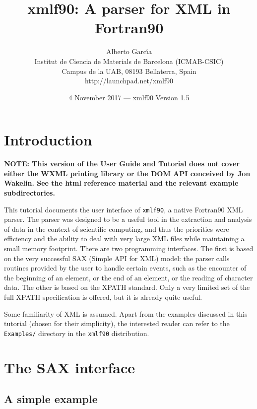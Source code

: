 \documentclass[11pt]{article}
\begin{document}
\title{xmlf90: A parser for XML in Fortran90}
\author{Alberto Garc\'{\i}a \\
  Institut de Ciencia de Materials de Barcelona (ICMAB-CSIC)\\
  Campus de la UAB, 08193 Bellaterra, Spain\\
           http://launchpad.net/xmlf90}
\date{4 November 2017 --- xmlf90 Version 1.5}

\maketitle\section{Introduction}

{\bf NOTE: This version of the User Guide and Tutorial does not
cover either the WXML printing library or the DOM API 
conceived by Jon Wakelin. See the html reference material and the
relevant example subdirectories.}
\bigskip

This tutorial documents the user interface of \texttt{xmlf90}, a
native Fortran90 XML parser. The parser was designed to be a useful
tool in the extraction and analysis of data in the context of
scientific computing, and thus the priorities were efficiency and the
ability to deal with very large XML files while maintaining a small
memory footprint. There are two programming interfaces. The first is
based on the very successful SAX (Simple API for XML) model: the
parser calls routines provided by the user to handle certain events,
such as the encounter of the beginning of an element, or the end of an
element, or the reading of character data.  The other is based on the
XPATH standard. Only a very limited set of the full XPATH
specification is offered, but it is already quite useful.

Some familiarity of XML is assumed. Apart from the examples discussed
in this tutorial (chosen for their simplicity), the interested reader
can refer to the \texttt{Examples/} directory in the \texttt{xmlf90}
distribution.



\section{The SAX interface}
\subsection{A simple example}
\end{document}
